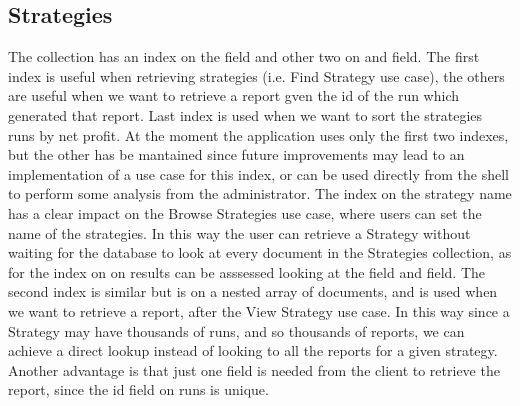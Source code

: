 


\subsection{Strategies}

The  collection has an index on the  field and other two on
 and  field. The first index is useful when retrieving strategies
(i.e. Find Strategy use case), the others are useful when we want to retrieve a
report gven the id of the run which generated that report. 
Last index is used when we want to sort the strategies runs by net profit. 
At the moment the application uses only the first
two indexes, but the other has be mantained since future improvements may lead to an
implementation of a use case for this index, or can be used directly from the
shell to perform some analysis from the administrator.
The index on the strategy name has a clear impact on the Browse Strategies use
case, where users can set the name of the strategies. In this way the user can 
retrieve a Strategy without waiting for the database to look at every document
in the Strategies collection, as for the index on  on 
results can be asssessed looking at the 
field and  field.
The second index is similar but is on a nested array of documents, and is used when we
want to retrieve a report, after the View Strategy use case. In this way since a
Strategy may have thousands of runs, and so thousands of reports, we can achieve
a direct lookup instead of looking to all the reports for a given strategy.
Another advantage is that just one field is needed from the client to retrieve
the report, since the id field on runs is unique.





